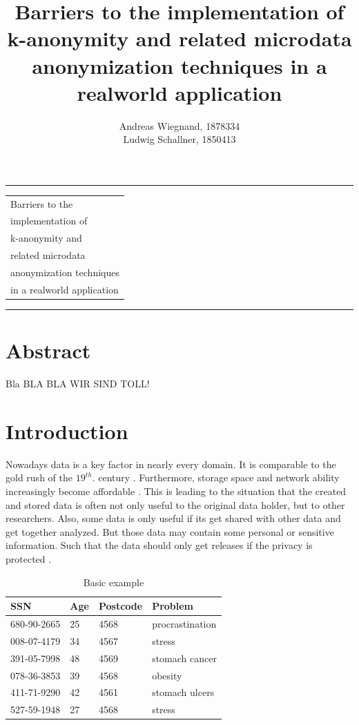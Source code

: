 \documentclass{llncs}
\begin{document}
\thispagestyle{empty}
\rule{\textwidth}{1pt}
\vspace{2pt}
\begin{flushright}
\Huge
\begin{tabular}{@{}l}
Barriers to the\\
implementation of\\
k-anonymity and\\
related microdata\\
anonymization techniques\\
in a realworld application\\[6pt]

\end{tabular}
\end{flushright}
\rule{\textwidth}{1pt}
\vfill
\title{Barriers to the implementation of k-anonymity and related microdata anonymization techniques in a realworld application}
\author{Andreas Wiegnand, 1878334\\
	Ludwig Schallner, 1850413}
\institute{}
\maketitle
%
\section*{Abstract}
Bla BLA BLA WIR SIND TOLL!
\newpage
\setcounter{page}{1}

\section{Introduction}
%
Nowadays data is a key factor in nearly every domain. It is comparable to the gold rush of the \ensuremath{19^{th}.} century \cite{datarevo}. Furthermore, storage space and network ability increasingly become affordable \cite{sweeney2002k}. 
This is leading to the situation that the created and stored data is often not only useful to the original data holder, but to other researchers. Also, some data is only useful if its get shared with other data and get together analyzed. But those data may contain some personal or sensitive information. Such that the data should only get releases if the privacy is protected \cite{li2006achieving}.\\
\begin{table}[]
	\centering
	\caption{Basic example}
	\label{intro_example}
	\begin{tabular}{@{}llll@{}}
		\toprule
		SSN         & Age & Postcode & Problem         \\ \midrule
		680-90-2665 & 25  & 4568     & procrastination \\
		008-07-4179 & 34  & 4567     & stress          \\
		391-05-7998 & 48  & 4569     & stomach cancer  \\
		078-36-3853 & 39  & 4568     & obesity         \\
		411-71-9290 & 42  & 4561     & stomach ulcers  \\
		527-59-1948 & 27  & 4568     & stress          \\ \bottomrule
	\end{tabular}
\end{table}
\end{document}
